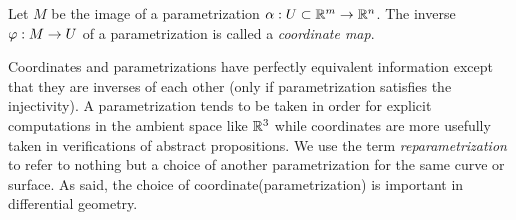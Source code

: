 \documentclass{../../large}
\def\a{\alpha}
\begin{document}
\begin{defn}
Let $M$ be the image of a parametrization $\a:U\subset\R^m\to\R^n$.
The inverse $\varphi:M\to U$ of a parametrization is called a \emph{coordinate map}.
\end{defn}

Coordinates and parametrizations have perfectly equivalent information except that they are inverses of each other (only if parametrization satisfies the injectivity).
A parametrization tends to be taken in order for explicit computations in the ambient space like $\mathbb{R}^3$ while coordinates are more usefully taken in verifications of abstract propositions.
We use the term \emph{reparametrization} to refer to nothing but a choice of another parametrization for the same curve or surface.
As said, the choice of coordinate(parametrization) is important in differential geometry.
\end{document}
